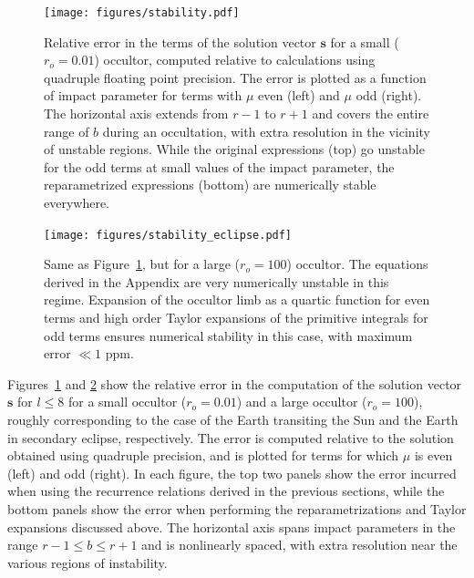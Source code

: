 \documentclass[modern]{aastex61}
\begin{document}
{\begin{figure}[ht!]
    \begin{centering}
    \texttt{[image: figures/stability.pdf]}
    \caption{\label{fig:stability_transit}
             Relative error in the terms of the solution vector $\mathbf{s}$ for a small
             ($r_o = 0.01$) occultor, computed relative to calculations using quadruple
             floating point precision. The error is plotted as a function of impact parameter
             for terms with $\mu$ even (left)
             and $\mu$ odd (right). The horizontal axis extends from $r - 1$ to $r + 1$ and covers
             the entire range of $b$ during an occultation, with extra resolution in the
             vicinity of unstable regions. While the original expressions (top) go unstable for
             the odd terms at small values of the impact parameter, the reparametrized
             expressions (bottom) are numerically stable everywhere.}
    \end{centering}
\end{figure}

\begin{figure}[ht!]
    \begin{centering}
    \texttt{[image: figures/stability\_eclipse.pdf]}
    \caption{\label{fig:stability_eclipse}
             Same as Figure~\ref{fig:stability_transit}, but for a large ($r_o = 100$) occultor.
             The equations derived in the Appendix are very numerically unstable in this regime.
             Expansion of the occultor limb as a quartic function for even terms and high order Taylor expansions
             of the primitive integrals for odd terms ensures numerical stability in this case,
             with maximum error $\ll 1$ ppm.}
    \end{centering}
\end{figure}

Figures~\ref{fig:stability_transit} and \ref{fig:stability_eclipse} show the relative error
in the computation of the solution vector $\mathbf{s}$ for $l \leq 8$ for a small occultor ($r_o = 0.01$)
and a large occultor ($r_o = 100$), roughly corresponding to the case of the Earth transiting the
Sun and the Earth in secondary eclipse, respectively. The error is computed relative to the solution
obtained using quadruple precision, and is plotted for terms for which $\mu$ is even (left) and
odd (right). In each figure, the top two panels show the error incurred when using the recurrence
relations derived in the previous sections, while the bottom panels show the error when performing
the reparametrizations and Taylor expansions discussed above. The horizontal axis spans impact parameters
in the range $r - 1 \leq b \leq r + 1$ and is nonlinearly spaced, with extra resolution near the various
regions of instability.

}
\end{document}
